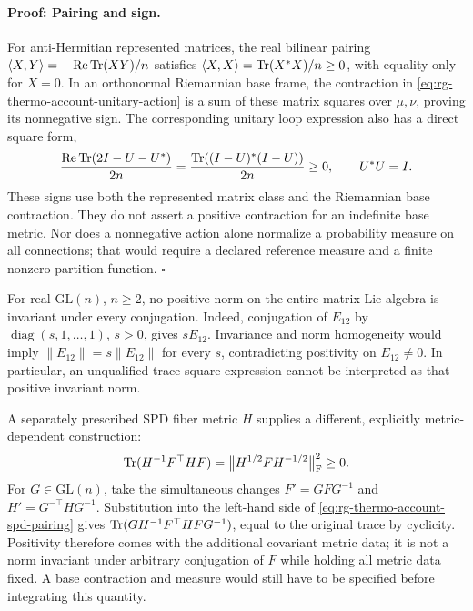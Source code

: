 \paragraph{Proof: Pairing and sign.}
For anti-Hermitian represented matrices, the real bilinear pairing
$\langle X,Y\rangle=-\operatorname{Re}\operatorname{Tr}(XY)/n$ satisfies
$\langle X,X\rangle=\operatorname{Tr}(X^*X)/n\geq0$, with equality only for
$X=0$. In an orthonormal Riemannian base frame, the contraction in
\cref{eq:rg-thermo-account-unitary-action} is a sum of these matrix
squares over $\mu,\nu$, proving its nonnegative sign. The corresponding
unitary loop expression also has a direct square form,
\begin{equation}
 \frac{\operatorname{Re}\operatorname{Tr}(2I-U-U^*)}{2n}
 =\frac{\operatorname{Tr}((I-U)^*(I-U))}{2n}\geq0,
 \qquad U^*U=I.
 \label{eq:rg-thermo-account-unitary-loop}
\end{equation}
These signs use both the represented matrix class and the Riemannian
base contraction. They do not assert a positive contraction for an
indefinite base metric. Nor does a nonnegative action alone normalize a
probability measure on all connections; that would require a declared
reference measure and a finite nonzero partition function. $\square$\thermoestablishedstatus


For real $\mathrm{GL}(n)$, $n\geq2$, no positive norm on the entire
matrix Lie algebra is invariant under every conjugation. Indeed,
conjugation of $E_{12}$ by $\operatorname{diag}(s,1,\ldots,1)$,
$s>0$, gives $sE_{12}$. Invariance and norm homogeneity would imply
$\|E_{12}\|=s\|E_{12}\|$ for every $s$, contradicting positivity
on $E_{12}\ne0$. In particular, an unqualified trace-square expression
cannot be interpreted as that positive invariant norm.\thermoestablishedstatus


A separately prescribed SPD fiber metric $H$ supplies a different,
explicitly metric-dependent construction:
\begin{equation}
 \operatorname{Tr}(H^{-1}F^\top HF)
 =\bigl\|H^{1/2}FH^{-1/2}\bigr\|_{\mathrm F}^2\geq0.
 \label{eq:rg-thermo-account-spd-pairing}
\end{equation}
For $G\in\mathrm{GL}(n)$, take the simultaneous changes
$F'=GFG^{-1}$ and $H'=G^{-\top}HG^{-1}$. Substitution into the
left-hand side of \cref{eq:rg-thermo-account-spd-pairing} gives
$\operatorname{Tr}(GH^{-1}F^\top HFG^{-1})$, equal to the original trace by
cyclicity. Positivity therefore comes with the additional covariant
metric data; it is not a norm invariant under arbitrary conjugation of
$F$ while holding all metric data fixed. A base contraction and measure
would still have to be specified before integrating this quantity.\thermoestablishedstatus

